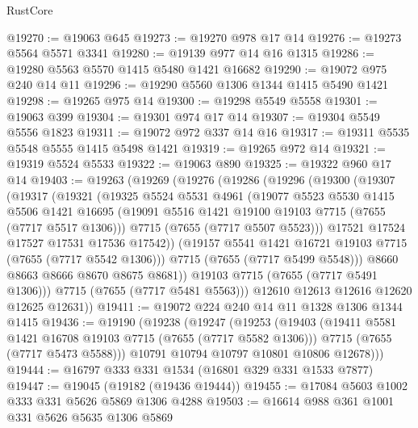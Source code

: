 \begin{lexlean}{RustCore}
\begin{coremodule}
@19270 := @19063 @645
@19273 := @19270 @978 @17 @14
@19276 := @19273 @5564 @5571 @3341
@19280 := @19139 @977 @14 @16 @1315
@19286 := @19280 @5563 @5570 @1415 @5480 @1421 @16682
@19290 := @19072 @975 @240 @14 @11
@19296 := @19290 @5560 @1306 @1344 @1415 @5490 @1421
@19298 := @19265 @975 @14
@19300 := @19298 @5549 @5558
@19301 := @19063 @399
@19304 := @19301 @974 @17 @14
@19307 := @19304 @5549 @5556 @1823
@19311 := @19072 @972 @337 @14 @16
@19317 := @19311 @5535 @5548 @5555 @1415 @5498 @1421
@19319 := @19265 @972 @14
@19321 := @19319 @5524 @5533
@19322 := @19063 @890
@19325 := @19322 @960 @17 @14
@19403 := @19263
    (@19269
      (@19276
        (@19286
          (@19296
            (@19300
              (@19307
                (@19317
                  (@19321
                    (@19325
                      @5524
                      @5531
                      @4961
                      (@19077
                        @5523
                        @5530
                        @1415
                        @5506
                        @1421
                        @16695
                        (@19091 @5516 @1421 @19100 @19103 @7715 (@7655 (@7717 @5517 @1306)))
                        @7715
                        (@7655 (@7717 @5507 @5523)))
                      @17521
                      @17524
                      @17527
                      @17531
                      @17536
                      @17542))
                  (@19157 @5541 @1421 @16721 @19103 @7715 (@7655 (@7717 @5542 @1306)))
                  @7715
                  (@7655 (@7717 @5499 @5548)))
                @8660
                @8663
                @8666
                @8670
                @8675
                @8681))
            @19103
            @7715
            (@7655 (@7717 @5491 @1306)))
          @7715
          (@7655 (@7717 @5481 @5563)))
        @12610
        @12613
        @12616
        @12620
        @12625
        @12631))
@19411 := @19072 @224 @240 @14 @11 @1328 @1306 @1344 @1415
@19436 := @19190
    (@19238
      (@19247
        (@19253
          (@19403
            (@19411 @5581 @1421 @16708 @19103 @7715 (@7655 (@7717 @5582 @1306)))
            @7715
            (@7655 (@7717 @5473 @5588)))
          @10791
          @10794
          @10797
          @10801
          @10806
          @12678)))
@19444 := @16797 @333 @331 @1534 (@16801 @329 @331 @1533 @7877)
@19447 := @19045 (@19182 (@19436 @19444))
@19455 := @17084 @5603 @1002 @333 @331 @5626 @5869 @1306 @4288
@19503 := @16614
    @988
    @361
    @1001
    @331
    @5626
    @5635
    @1306
    @5869

\end{coremodule}
\end{lexlean}
